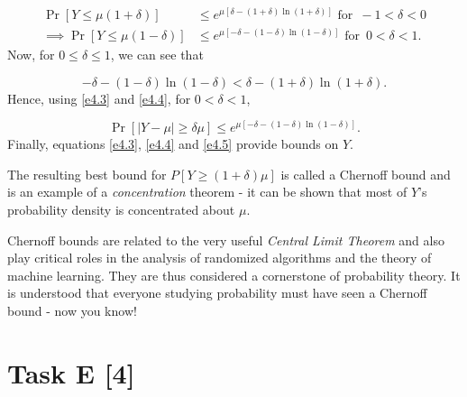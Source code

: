 \begin{equation}
    \begin{aligned}
        \Pr[Y\le\mu(1+\delta)] &\le e^{\mu[\delta-(1+\delta)\ln(1+\delta)]} 
        \text{\ for }\, -1<\delta<0 \\
        \implies \Pr[Y\le\mu(1-\delta)] &\le e^{\mu[-\delta-(1-\delta)
        \ln(1-\delta)]} \text{\ for }\, 0<\delta<1.
    \end{aligned}
    \label{e4.4}
\end{equation}
Now, for $0\le\delta\le 1$, we can see that

\begin{equation*}
    -\delta-(1-\delta)\ln(1-\delta) < \delta-(1+\delta)\ln(1+\delta).
\end{equation*}
Hence, using \ref{e4.3} and \ref{e4.4}, for $0<\delta<1$,

\begin{equation}
    \Pr[|Y-\mu|\ge\delta\mu] \le e^{\mu[-\delta-(1-\delta)\ln(1-\delta)]}.
    \label{e4.5}
\end{equation}
Finally, equations \ref{e4.3}, \ref{e4.4} and \ref{e4.5} provide bounds on
$Y$.

\begin{tcolorbox}[title=]
    The resulting best bound for $P[Y \ge (1 + \delta) \mu]$ is called a Chernoff
    bound and is an example of a \textit{concentration} theorem - it can be shown
    that most of $Y$'s probability density is concentrated about $\mu$.

    Chernoff bounds are related to the very useful \textit{Central Limit Theorem}
    and also play critical roles in the analysis of randomized algorithms and
    the theory of machine learning. They are thus considered a cornerstone of
    probability theory. It is understood that everyone studying probability must
    have seen a Chernoff bound - now you know!
\end{tcolorbox}

\section*{\colS{$\S$} Task E \hfill \normalfont \large [4]}

